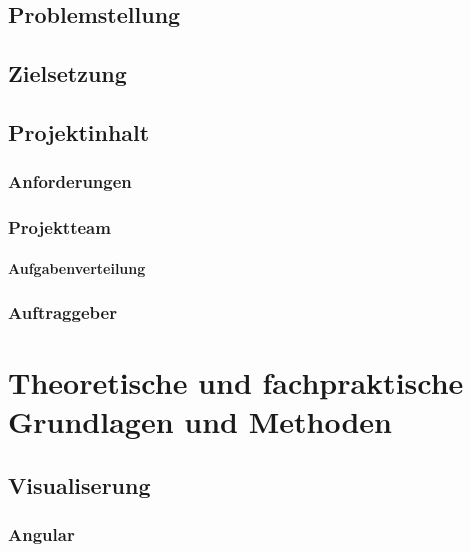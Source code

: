 \documentclass[pdftex,11pt,a4paper]{book}
\begin{document}
\section{Problemstellung}
\section{Zielsetzung}
\section{Projektinhalt}
\subsection{Anforderungen}
\subsection{Projektteam}
\subsubsection{Aufgabenverteilung}
\subsection{Auftraggeber}

\chapter{Theoretische und fachpraktische Grundlagen und Methoden}
\section{Visualiserung}
\subsection{Angular}
\end{document}
